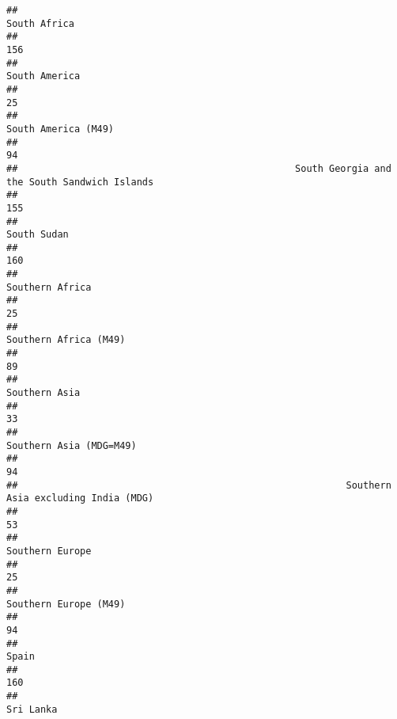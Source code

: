 \documentclass[]{article}
\begin{document}
\begin{verbatim}
##                                                                                 South Africa 
##                                                                                          156 
##                                                                                South America 
##                                                                                           25 
##                                                                          South America (M49) 
##                                                                                           94 
##                                                 South Georgia and the South Sandwich Islands 
##                                                                                          155 
##                                                                                  South Sudan 
##                                                                                          160 
##                                                                              Southern Africa 
##                                                                                           25 
##                                                                        Southern Africa (M49) 
##                                                                                           89 
##                                                                                Southern Asia 
##                                                                                           33 
##                                                                      Southern Asia (MDG=M49) 
##                                                                                           94 
##                                                          Southern Asia excluding India (MDG) 
##                                                                                           53 
##                                                                              Southern Europe 
##                                                                                           25 
##                                                                        Southern Europe (M49) 
##                                                                                           94 
##                                                                                        Spain 
##                                                                                          160 
##                                                                                    Sri Lanka 

\end{verbatim}
\end{document}
